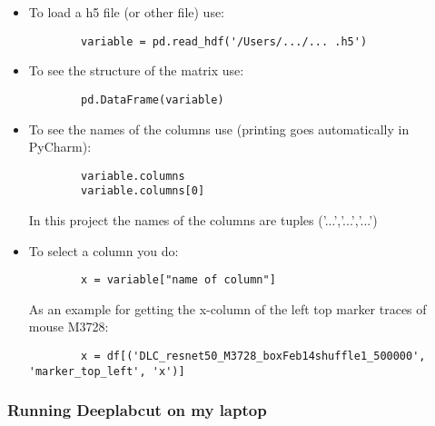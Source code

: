 \documentclass{article}
\begin{document}
\begin{itemize}
    \item To load a h5 file (or other file) use:
    \begin{verbatim}
        variable = pd.read_hdf('/Users/.../... .h5')
    \end{verbatim}
    
    \item To see the structure of the matrix use:
    \begin{verbatim}
        pd.DataFrame(variable)
    \end{verbatim}
    
    \item To see the names of the columns use (printing goes automatically in PyCharm):
    \begin{verbatim}
        variable.columns
        variable.columns[0]
    \end{verbatim}
    In this project the names of the columns are tuples ('...','...','...')
    
    \item To select a column you do:
    \begin{verbatim}
        x = variable["name of column"]
    \end{verbatim}
    As an example for getting the x-column of the left top marker traces of mouse M3728:
    \begin{verbatim}
        x = df[('DLC_resnet50_M3728_boxFeb14shuffle1_500000', 'marker_top_left', 'x')]
    \end{verbatim}
\end{itemize}



\subsubsection{Running Deeplabcut on my laptop}
\end{document}
